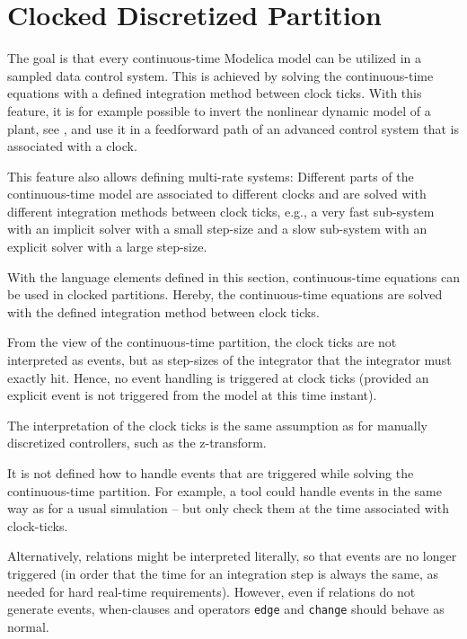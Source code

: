 \section{Clocked Discretized Partition}\label{continuous-time-equations-in-clocked-partitions}\label{clocked-discretized-partition}

\begin{nonnormative}
The goal is that every continuous-time Modelica model can be utilized in a sampled data control system.
This is achieved by solving the continuous-time equations with a defined integration method between clock ticks.
With this feature, it is for example possible to invert the nonlinear dynamic model of a plant, see \textcite{ThummelEtAl2005InverseModels}, and use it in a feedforward path of an advanced control system that is associated with a clock.

This feature also allows defining multi-rate systems: Different parts of the continuous-time model are associated to different clocks and are solved with different integration
methods between clock ticks, e.g., a very fast sub-system with an implicit solver with a small step-size and a slow sub-system with an explicit solver with a large step-size.
\end{nonnormative}

With the language elements defined in this section, continuous-time
equations can be used in clocked partitions. Hereby, the continuous-time
equations are solved with the defined integration method between clock
ticks.

From the view of the continuous-time partition, the clock ticks are not interpreted as events, but as step-sizes of the integrator that the integrator must exactly hit.
Hence, no event handling is triggered at clock ticks (provided an explicit event is not triggered from the model at this time instant).

\begin{nonnormative}
The interpretation of the clock ticks is the same assumption as for manually discretized controllers, such as the z-transform.
\end{nonnormative}

\begin{nonnormative}
It is not defined how to handle events that are triggered while solving the continuous-time partition.
For example, a tool could handle events in the same way as for a usual simulation -- but only check them at the time associated with clock-ticks.

Alternatively, relations might be interpreted literally, so that events are no longer triggered (in order that the time for an integration step is always the same, as needed for hard real-time requirements).
However, even if relations do not generate events, when-clauses and operators \lstinline!edge! and \lstinline!change! should behave as normal.
\end{nonnormative}

